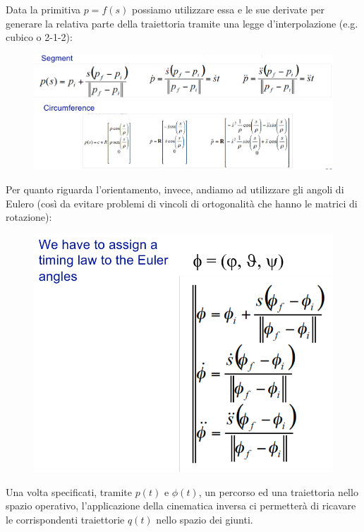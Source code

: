 Data la primitiva $p = f(s)$ possiamo utilizzare essa e le sue derivate per generare la relativa parte della traiettoria tramite una legge d'interpolazione (e.g. cubico o 2-1-2):

\begin{figure}[H]
	\centering
	\includegraphics[width=0.9\linewidth]{images/trajectories_19}
	\label{fig:trajectories19}
\end{figure}

Per quanto riguarda l'orientamento, invece, andiamo ad utilizzare gli angoli di Eulero (così da evitare problemi di vincoli di ortogonalità che hanno le matrici di rotazione):
\begin{figure}[H]
	\centering
	\includegraphics[width=0.5\linewidth]{images/trajectories_20}
	\label{fig:trajectories20}
\end{figure}

Una volta specificati, tramite $p(t)$ e $\phi(t)$, un percorso ed una traiettoria nello spazio operativo, l'applicazione della cinematica inversa ci permetterà di ricavare le corrispondenti traiettorie $q(t)$ nello spazio dei giunti.
